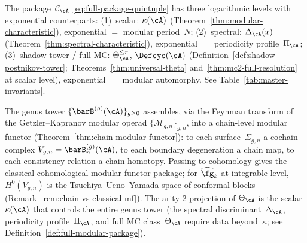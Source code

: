 \begin{remark}
\label{rem:modular-characteristic-package}
\label{rem:characteristic-hierarchy}
The package~$\mathcal{C}_{\cA}$ \eqref{eq:full-package-quintuple}
has three logarithmic levels with exponential counterparts:
(1)~scalar: $\kappa(\cA)$ (Theorem~\ref{thm:modular-characteristic}),
exponential $=$ modular period~$N$;
(2)~spectral: $\Delta_{\cA}(x)$
(Theorem~\ref{thm:spectral-characteristic}),
exponential $=$ periodicity profile~$\Pi_{\cA}$;
(3)~shadow tower / full MC: $\Theta_{\cA}^{\leq r}$, $\Defcyc(\cA)$
(Definition~\ref{def:shadow-postnikov-tower};
Theorems~\ref{thm:universal-theta} and~\ref{thm:mc2-full-resolution}
at scalar level),
exponential $=$ modular automorphy.
See Table~\ref{tab:master-invariants}.
\end{remark}

\medskip
The genus tower $\{\barB^{(g)}(\cA)\}_{g \geq 0}$ assembles, via the Feynman
transform of the Getzler--Kapranov modular operad
$\{\overline{\mathcal{M}}_{g,n}\}_{g,n}$, into a
chain-level modular functor
(Theorem~\ref{thm:chain-modular-functor}): to each surface~$\Sigma_{g,n}$ a
cochain complex $V_{g,n} = \barB^{(g)}_n(\cA)$, to each boundary
degeneration a chain map, to each consistency relation a chain
homotopy.  Passing to cohomology gives the classical
cohomological modular-functor package;
for $\widehat{\fg}_k$ at integrable level, $H^0(V_{g,n})$ is the
Tsuchiya--Ueno--Yamada space of conformal blocks
(Remark~\ref{rem:chain-vs-classical-mf}).  The arity-$2$ projection
of $\Theta_\cA$ is the scalar $\kappa(\cA)$ that controls the
entire genus tower (the spectral discriminant~$\Delta_\cA$,
periodicity profile~$\Pi_\cA$, and full MC
class~$\Theta_\cA$ require data beyond~$\kappa$;
see Definition~\ref{def:full-modular-package}).


